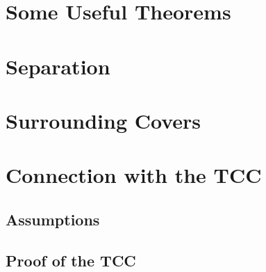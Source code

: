 \documentclass[12pt]{article}
\begin{document}

\section{Some Useful Theorems}


\section{Separation}


\section{Surrounding Covers}




\clearpage

\section{Connection with the TCC}

\subsection{Assumptions}


\subsection{Proof of the TCC}

\end{document}
